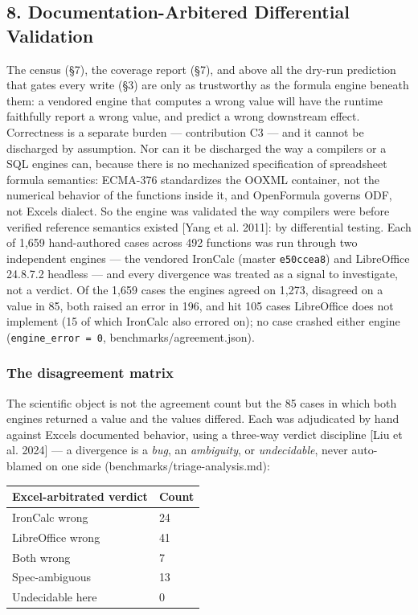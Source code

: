 \documentclass[
]{article}
\newcounter{none} %
\begin{document}
\subsection{8. Documentation-Arbitered Differential
Validation}\label{8-documentation-arbitered-differential-validation}

The census (§7), the coverage report (§7), and above all the dry-run
prediction that gates every write (§3) are only as trustworthy as the
formula engine beneath them: a vendored engine that computes a wrong
value will have the runtime faithfully report a wrong value, and predict
a wrong downstream effect. Correctness is a separate burden ---
contribution C3 --- and it cannot be discharged by assumption. Nor can
it be discharged the way a compiler\textquotesingle s or a SQL
engine\textquotesingle s can, because there is no mechanized
specification of spreadsheet formula semantics: ECMA-376 standardizes
the OOXML container, not the numerical behavior of the functions inside
it, and OpenFormula governs ODF, not Excel\textquotesingle s dialect. So
the engine was validated the way compilers were before verified
reference semantics existed {[}Yang et al. 2011{]}: by differential
testing. Each of 1,659 hand-authored cases across 492 functions was run
through two independent engines --- the vendored IronCalc (master
\texttt{e50ccea8}) and LibreOffice 24.8.7.2 headless --- and every
divergence was treated as a signal to investigate, not a verdict. Of the
1,659 cases the engines agreed on 1,273, disagreed on a value in 85,
both raised an error in 196, and hit 105 cases LibreOffice does not
implement (15 of which IronCalc also errored on); no case crashed either
engine (\texttt{engine\_error\ =\ 0}, benchmarks/agreement.json).

\subsubsection{The disagreement matrix}\label{the-disagreement-matrix}

The scientific object is not the agreement count but the 85 cases in
which both engines returned a value and the values differed. Each was
adjudicated by hand against Excel\textquotesingle s documented behavior,
using a three-way verdict discipline {[}Liu et al. 2024{]} --- a
divergence is a \emph{bug}, an \emph{ambiguity}, or \emph{undecidable},
never auto-blamed on one side (benchmarks/triage-analysis.md):

{\def\LTcaptype{none} %
\begin{longtable}[]{@{}ll@{}}
\toprule\noalign{}
Excel-arbitrated verdict & Count \\
\midrule\noalign{}
\endhead
\bottomrule\noalign{}
\endlastfoot
IronCalc wrong & 24 \\
LibreOffice wrong & 41 \\
Both wrong & 7 \\
Spec-ambiguous & 13 \\
Undecidable here & 0 \\
\end{longtable}
}
\end{document}
